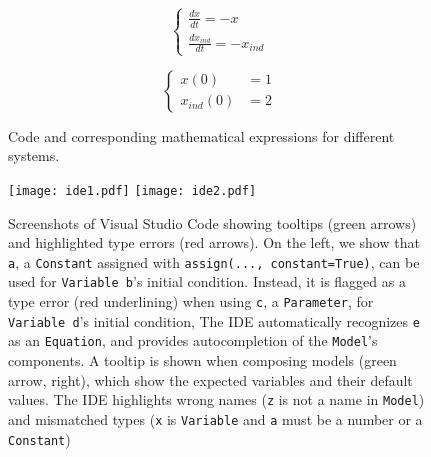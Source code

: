 \begin{figure}[t]
\begin{minipage}[t]{\columnwidth}
{\begin{minipage}[c]{\columnwidth}
{    }
    
    \end{minipage}%
    \newline
    \begin{minipage}[c]{0.5\columnwidth}
    \[
    \begin{cases}
        \frac{dx}{dt} = -x \\
        \frac{dx_{ind}}{dt} = -x_{ind}
    \end{cases}
    \]
  \end{minipage}%
  \begin{minipage}[c]{0.5\columnwidth}
    \[
    \begin{cases}
        x(0) &= 1 \\
        x_{ind}(0) &= 2
    \end{cases}
    \]
    \end{minipage}%
    
    
    }
    
    \end{minipage}%
    
    \caption{\label{fig-poincare}Code and corresponding mathematical
    expressions for different systems.}
    
\end{figure}
    
  
\begin{figure}[t]
  \texttt{[image: ide1.pdf]}
  \texttt{[image: ide2.pdf]}
  \caption{
    \label{fig-ide}
    Screenshots of Visual Studio Code showing
    tooltips (green arrows) and
    highlighted type errors (red arrows).
    On the left,
    we show that \texttt{a},
    a \texttt{Constant} assigned with \texttt{assign(...,\ constant=True)},
    can be used for \texttt{Variable b}'s initial condition.
    Instead,
    it is flagged as a type error (red underlining)
    when using \texttt{c}, a \texttt{Parameter},
    for \texttt{Variable d}'s initial condition,
    The IDE automatically recognizes \texttt{e} as an \texttt{Equation},
    and provides autocompletion of the \texttt{Model}'s components.
    A tooltip is shown when composing models (green arrow, right),
    which show the expected variables and their default values.
    The IDE highlights wrong names (\texttt{z} is not a name in \texttt{Model})
    and mismatched types (\texttt{x} is \texttt{Variable} and \texttt{a} must be a number or a \texttt{Constant})
  }  
\end{figure}
  
